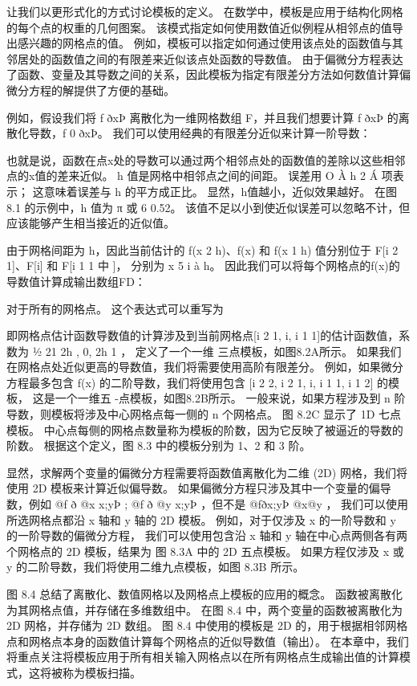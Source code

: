 让我们以更形式化的方式讨论模板的定义。 在数学中，模板是应用于结构化网格的每个点的权重的几何图案。 
该模式指定如何使用数值近似例程从相邻点的值导出感兴趣的网格点的值。 
例如，模板可以指定如何通过使用该点处的函数值与其邻居处的函数值之间的有限差来近似该点处函数的导数值。 
由于偏微分方程表达了函数、变量及其导数之间的关系，因此模板为指定有限差分方法如何数值计算偏微分方程的解提供了方便的基础。

例如，假设我们将 f ðxÞ 离散化为一维网格数组 F，并且我们想要计算 f ðxÞ 的离散化导数，f 0 ðxÞ。 
我们可以使用经典的有限差分近似来计算一阶导数：

也就是说，函数在点x处的导数可以通过两个相邻点处的函数值的差除以这些相邻点的x值的差来近似。 
h 值是网格中相邻点之间的间距。 误差用 O À h 2 Á 项表示； 这意味着误差与 h 的平方成正比。 
显然，h值越小，近似效果越好。 在图 8.1 的示例中，h 值为 π 或 6 0.52。 
该值不足以小到使近似误差可以忽略不计，但应该能够产生相当接近的近似值。

由于网格间距为 h，因此当前估计的 f(x 2 h)、f(x) 和 f(x 1 h) 值分别位于 F[i 2 1]、F[i] 和 F[i 1 1 中 ]，
分别为 x 5 i à h。 因此我们可以将每个网格点的f(x)的导数值计算成输出数组FD：

对于所有的网格点。 这个表达式可以重写为

即网格点估计函数导数值的计算涉及到当前网格点[i 2 1, i, i 1 1]的估计函数值，系数为 ½ 21 2h , 0, 2h 1 ，
定义了一个一维 三点模板，如图8.2A所示。 如果我们在网格点处近似更高的导数值，我们将需要使用高阶有限差分。 
例如，如果微分方程最多包含 f(x) 的二阶导数，我们将使用包含 [i 2 2, i 2 1, i, i 1 1, i 1 2] 的模板，
这是一个一维五 -点模板，如图8.2B所示。 一般来说，如果方程涉及到 n 阶导数，则模板将涉及中心网格点每一侧的 n 个网格点。 
图 8.2C 显示了 1D 七点模板。 中心点每侧的网格点数量称为模板的阶数，因为它反映了被逼近的导数的阶数。 
根据这个定义，图 8.3 中的模板分别为 1、2 和 3 阶。

显然，求解两个变量的偏微分方程需要将函数值离散化为二维 (2D) 网格，我们将使用 2D 模板来计算近似偏导数。 
如果偏微分方程只涉及其中一个变量的偏导数，例如 @f ð @x x;yÞ ; @f ð @y x;yÞ ，但不是 @fðx;yÞ @x@y ，
我们可以使用所选网格点都沿 x 轴和 y 轴的 2D 模板。 例如，对于仅涉及 x 的一阶导数和 y 的一阶导数的偏微分方程，
我们可以使用包含沿 x 轴和 y 轴在中心点两侧各有两个网格点的 2D 模板，结果为 图 8.3A 中的 2D 五点模板。 
如果方程仅涉及 x 或 y 的二阶导数，我们将使用二维九点模板，如图 8.3B 所示。

图 8.4 总结了离散化、数值网格以及网格点上模板的应用的概念。 函数被离散化为其网格点值，并存储在多维数组中。 
在图 8.4 中，两个变量的函数被离散化为 2D 网格，并存储为 2D 数组。 
图 8.4 中使用的模板是 2D 的，用于根据相邻网格点和网格点本身的函数值计算每个网格点的近似导数值（输出）。 
在本章中，我们将重点关注将模板应用于所有相关输入网格点以在所有网格点生成输出值的计算模式，这将被称为模板扫描。

